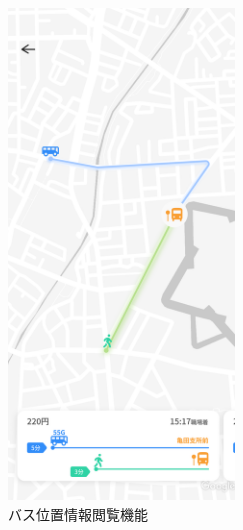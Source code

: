\begin{figure}[htbp]
    \centering
    \includegraphics[width=6cm]{images/feature_routeview.png}
    \caption{バス位置情報閲覧機能}
    \label{fig:feature_routeview}
\end{figure}
